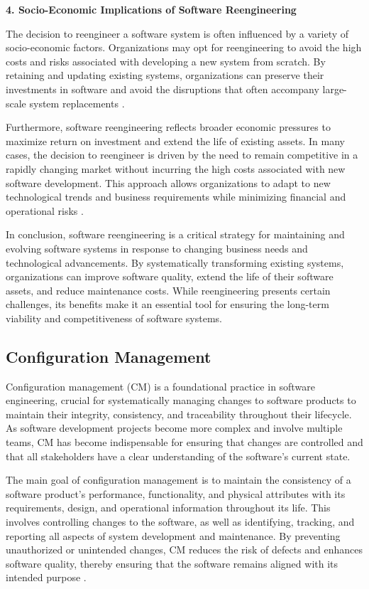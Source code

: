 \begin{refsection}
\textbf{4. Socio-Economic Implications of Software Reengineering}

The decision to reengineer a software system is often influenced by a variety of socio-economic factors. Organizations may opt for reengineering to avoid the high costs and risks associated with developing a new system from scratch. By retaining and updating existing systems, organizations can preserve their investments in software and avoid the disruptions that often accompany large-scale system replacements \cite[pp.~234-236]{bennett2002software}.

Furthermore, software reengineering reflects broader economic pressures to maximize return on investment and extend the life of existing assets. In many cases, the decision to reengineer is driven by the need to remain competitive in a rapidly changing market without incurring the high costs associated with new software development. This approach allows organizations to adapt to new technological trends and business requirements while minimizing financial and operational risks \cite[pp.~654-655]{sommerville2016software}.

In conclusion, software reengineering is a critical strategy for maintaining and evolving software systems in response to changing business needs and technological advancements. By systematically transforming existing systems, organizations can improve software quality, extend the life of their software assets, and reduce maintenance costs. While reengineering presents certain challenges, its benefits make it an essential tool for ensuring the long-term viability and competitiveness of software systems.

\subsection{Configuration Management}

Configuration management (CM) is a foundational practice in software engineering, crucial for systematically managing changes to software products to maintain their integrity, consistency, and traceability throughout their lifecycle. As software development projects become more complex and involve multiple teams, CM has become indispensable for ensuring that changes are controlled and that all stakeholders have a clear understanding of the software's current state.

The main goal of configuration management is to maintain the consistency of a software product's performance, functionality, and physical attributes with its requirements, design, and operational information throughout its life. This involves controlling changes to the software, as well as identifying, tracking, and reporting all aspects of system development and maintenance. By preventing unauthorized or unintended changes, CM reduces the risk of defects and enhances software quality, thereby ensuring that the software remains aligned with its intended purpose \cite[pp.~91-93]{crispin2021agile}.


\end{refsection}
